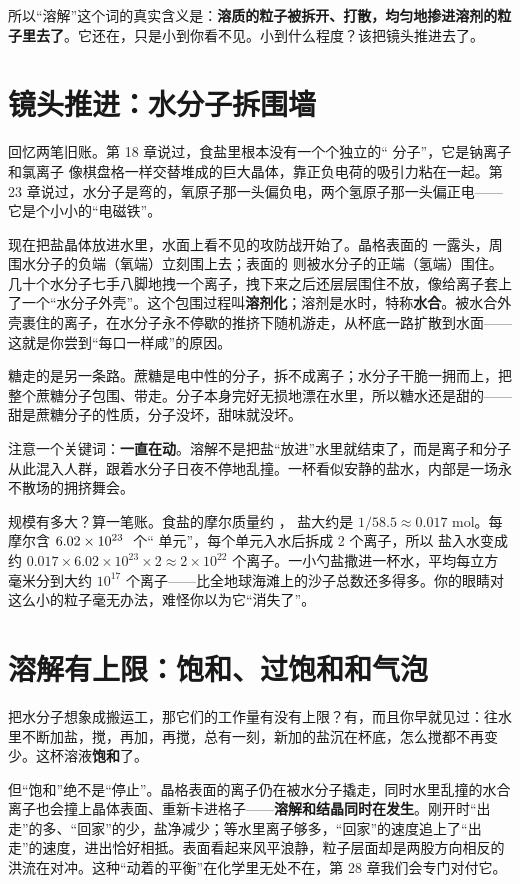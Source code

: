 所以“溶解”这个词的真实含义是：\textbf{溶质的粒子被拆开、打散，均匀地掺进溶剂的粒子里去了}。它还在，只是小到你看不见。小到什么程度？该把镜头推进去了。

\section{镜头推进：水分子拆围墙}

回忆两笔旧账。第 18 章说过，食盐里根本没有一个个独立的“ 分子”，它是钠离子  和氯离子  像棋盘格一样交替堆成的巨大晶体，靠正负电荷的吸引力粘在一起。第 23 章说过，水分子是弯的，氧原子那一头偏负电，两个氢原子那一头偏正电——它是个小小的“电磁铁”。

现在把盐晶体放进水里，水面上看不见的攻防战开始了。晶格表面的  一露头，周围水分子的负端（氧端）立刻围上去；表面的  则被水分子的正端（氢端）围住。几十个水分子七手八脚地拽一个离子，拽下来之后还层层围住不放，像给离子套上了一个“水分子外壳”。这个包围过程叫\textbf{溶剂化}；溶剂是水时，特称\textbf{水合}。被水合外壳裹住的离子，在水分子永不停歇的推挤下随机游走，从杯底一路扩散到水面——这就是你尝到“每口一样咸”的原因。

糖走的是另一条路。蔗糖是电中性的分子，拆不成离子；水分子干脆一拥而上，把整个蔗糖分子包围、带走。分子本身完好无损地漂在水里，所以糖水还是甜的——甜是蔗糖分子的性质，分子没坏，甜味就没坏。

注意一个关键词：\textbf{一直在动}。溶解不是把盐“放进”水里就结束了，而是离子和分子从此混入人群，跟着水分子日夜不停地乱撞。一杯看似安静的盐水，内部是一场永不散场的拥挤舞会。

规模有多大？算一笔账。食盐的摩尔质量约 ， 盐大约是 $1/58.5\approx 0.017$ mol。每摩尔含 $6.02\times 10^{23}\ \mathrm{}$ 个“ 单元”，每个单元入水后拆成 2 个离子，所以  盐入水变成约 $0.017\times 6.02\times 10^{23}\times 2\approx 2\times 10^{22}$ 个离子。一小勺盐撒进一杯水，平均每立方毫米分到大约 $10^{17}$ 个离子——比全地球海滩上的沙子总数还多得多。你的眼睛对这么小的粒子毫无办法，难怪你以为它“消失了”。

\section{溶解有上限：饱和、过饱和和气泡}

把水分子想象成搬运工，那它们的工作量有没有上限？有，而且你早就见过：往水里不断加盐，搅，再加，再搅，总有一刻，新加的盐沉在杯底，怎么搅都不再变少。这杯溶液\textbf{饱和}了。

但“饱和”绝不是“停止”。晶格表面的离子仍在被水分子撬走，同时水里乱撞的水合离子也会撞上晶体表面、重新卡进格子——\textbf{溶解和结晶同时在发生}。刚开时“出走”的多、“回家”的少，盐净减少；等水里离子够多，“回家”的速度追上了“出走”的速度，进出恰好相抵。表面看起来风平浪静，粒子层面却是两股方向相反的洪流在对冲。这种“动着的平衡”在化学里无处不在，第 28 章我们会专门对付它。

